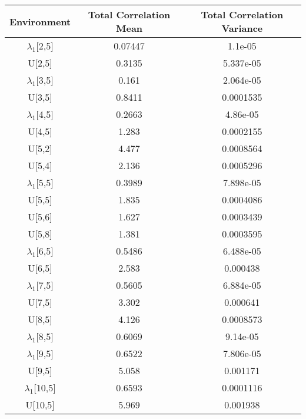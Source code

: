 \begin{table}[ht!]
\centering
\begin{tabular}{|c|c|c|}
\hline
Environment & Total Correlation Mean& Total Correlation Variance\\
\hline
\hline
$\lambda_{1}$[2,5] &0.07447&1.1e-05\\
U[2,5] &0.3135&5.337e-05\\
$\lambda_{1}$[3,5] &0.161&2.064e-05\\
U[3,5] &0.8411&0.0001535\\
$\lambda_{1}$[4,5] &0.2663&4.86e-05\\
U[4,5] &1.283&0.0002155\\
U[5,2] &4.477&0.0008564\\
U[5,4] &2.136&0.0005296\\
$\lambda_{1}$[5,5] &0.3989&7.898e-05\\
U[5,5] &1.835&0.0004086\\
U[5,6] &1.627&0.0003439\\
U[5,8] &1.381&0.0003595\\
$\lambda_{1}$[6,5] &0.5486&6.488e-05\\
U[6,5] &2.583&0.000438\\
$\lambda_{1}$[7,5] &0.5605&6.884e-05\\
U[7,5] &3.302&0.000641\\
U[8,5] &4.126&0.0008573\\
$\lambda_{1}$[8,5] &0.6069&9.14e-05\\
$\lambda_{1}$[9,5] &0.6522&7.806e-05\\
U[9,5] &5.058&0.001171\\
$\lambda_{1}$[10,5] &0.6593&0.0001116\\
U[10,5] &5.969&0.001938\\
\hline
\end{tabular}
\end{table}
